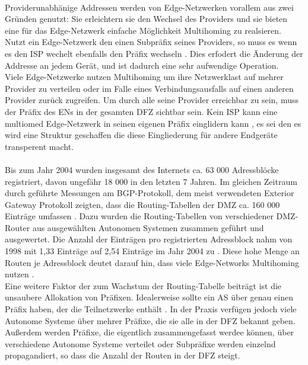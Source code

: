 \paragraph{}
Providerunabhänige Addressen werden von Edge-Netzwerken vorallem aus zwei Gründen genutzt: Sie erleichtern sie den Wechsel des Providers und sie bieten eine für das Edge-Netzwerk einfache Möglichkeit Multihoming zu realsieren. Nutzt ein Edge-Netzwerk den einen Subpräfix seines Providers, so muss es wenn es den ISP wechelt ebenfalls den Präfix wechseln \cite{jen:2008:start}. Dies erfodert die Änderung der Addresse an jedem Gerät, und ist dadurch eine sehr aufwendige Operation. \\
Viele Edge-Netzwerke nutzen Multihoming um ihre Netzwerklast auf mehrer Provider zu verteilen oder im Falle eines Verbindungsausfalls auf einen anderen Provider zurück zugreifen. Um durch alle seine Provider erreichbar zu sein, muss der Präfix des ENs in der gesamten DFZ sichtbar sein. Kein ISP kann eine multiomed Edge-Netzwerk in seinen eigenen Präfix einglidern kann \cite{jen:2008:start}, es sei den es wird eine Struktur geschaffen die diese Eingliederung für andere Endgeräte transperent macht.

\paragraph{}
Bis zum Jahr 2004 wurden insgesamt des Internets ca. 63 000 Adressblöcke registriert, davon ungefähr 18 000 in den letzten 7 Jahren. Im gleichen Zeitraum durch geführte Messungen am BGP-Protokoll, dem meist verwendeten Exterior Gateway Protokoll zeigten, dass die Routing-Tabellen der DMZ ca. 160 000 Einträge umfassen \cite{journals/ccr/MengXZHLZ04}. Dazu wurden die Routing-Tabellen von verschiedener DMZ-Router aus ausgewählten Autonomen Systemen zusammen geführt und ausgewertet. Die Anzahl der Einträgen pro registrierten Adressblock nahm von 1998 mit 1,33 Einträge auf 2,54 Einträge im Jahr 2004 zu \cite{journals/ccr/MengXZHLZ04}. Diese hohe Menge an Routen je Adressblock deutet darauf hin, dass viele Edge-Networks Multihoming nutzen \cite{huston:2001:analyzing}.\\

Eine weitere Faktor der zum Wachstum der Routing-Tabelle beiträgt ist die unsaubere Allokation von Präfixen. Idealerweise sollte ein AS über genau einen Präfix haben, der die Teilnetzwerke enthält \cite{hawkinson:1996:autnomousSystems}. In der Praxis verfügen jedoch viele Autonome Systeme über mehrer Präfixe, die sie alle in der DFZ bekannt geben. Außerdem werden Präfixe, die eigentlich zusammengefasst werdee können, über verschiedene Autonome Systeme verteilet oder Subpräfixe werden einzelnd propagandiert, so dass die Anzahl der Routen in der DFZ steigt. \\

